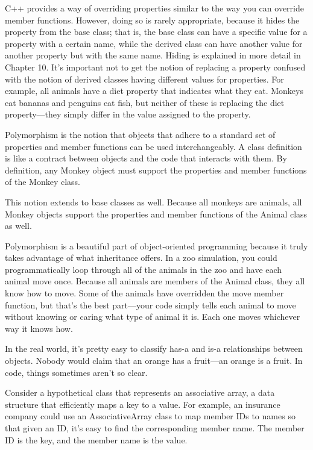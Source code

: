 
C++ provides a way of overriding properties similar to the way you can override member functions.
However, doing so is rarely appropriate, because it hides the property from the base class; that is, the base class can have a specific value for a property with a certain name, while the derived class can have another value for another property but with the same name. Hiding is explained in more detail in Chapter 10. It’s important not to get the notion of replacing a property confused with the notion of derived classes having different values for properties. For example, all animals have a diet property that indicates what they eat. Monkeys eat bananas and penguins eat fish, but neither of these is replacing the diet property—they simply differ in the value assigned to the property.


Polymorphism is the notion that objects that adhere to a standard set of properties and member functions can be used interchangeably. A class definition is like a contract between objects and the code that interacts with them. By definition, any Monkey object must support the properties and member functions of the Monkey class.

This notion extends to base classes as well. Because all monkeys are animals, all Monkey objects support the properties and member functions of the Animal class as well.

Polymorphism is a beautiful part of object-oriented programming because it truly takes advantage of what inheritance offers. In a zoo simulation, you could programmatically loop through all of the animals in the zoo and have each animal move once. Because all animals are members of the Animal class, they all know how to move. Some of the animals have overridden the move member function, but that’s the best part—your code simply tells each animal to move without knowing or caring what type of animal it is. Each one moves whichever way it knows how.


In the real world, it’s pretty easy to classify has-a and is-a relationships between objects. Nobody would claim that an orange has a fruit—an orange is a fruit. In code, things sometimes aren’t so clear.

Consider a hypothetical class that represents an associative array, a data structure that efficiently maps a key to a value. For example, an insurance company could use an AssociativeArray class to map member IDs to names so that given an ID, it’s easy to find the corresponding member name. The member ID is the key, and the member name is the value.

